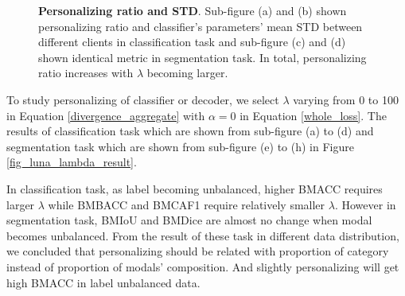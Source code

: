 \documentclass[journal]{IEEEtran}
\begin{document}
\begin{figure}
	\caption{\textbf{Personalizing ratio and STD}. Sub-figure (a) and (b) shown personalizing ratio and classifier's parameters' mean STD between different clients in classification task and sub-figure (c) and (d) shown identical metric in segmentation task. In total, personalizing ratio increases with $\lambda$ becoming larger.}
	\label{fig_lambda_select_result}
\end{figure}

To study personalizing of classifier or decoder, we select $\lambda$ varying from 0 to 100 in Equation \ref{divergence_aggregate} with $\alpha=0$ in Equation \ref{whole_loss}. The results of classification task which are shown from sub-figure (a) to (d) and segmentation task which are shown from sub-figure (e) to (h) in Figure \ref{fig_luna_lambda_result}. 

In classification task, as label becoming unbalanced, higher BMACC requires larger $\lambda$ while BMBACC and BMCAF1 require relatively smaller $\lambda$. However in segmentation task, BMIoU and BMDice are almost no change when modal becomes unbalanced. From the result of these task in different data distribution, we concluded that personalizing should be related with proportion of category  instead of proportion of modals' composition. And slightly personalizing will get high BMACC in label unbalanced data.
\end{document}
